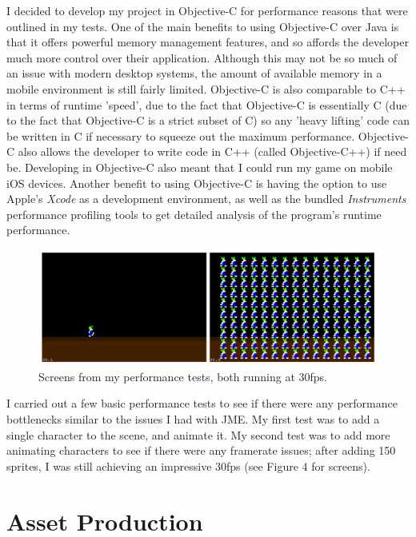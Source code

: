 \documentclass[a4paper,oneside]{report}
\begin{document}
I decided to develop my project in Objective-C for performance reasons that were outlined in my tests. One of the main benefits to using Objective-C over Java is that it offers powerful memory management features, and so affords the developer much more control over their application. Although this may not be so much of an issue with modern desktop systems, the amount of available memory in a mobile environment is still fairly limited. Objective-C is also comparable to C++ in terms of runtime 'speed', due to the fact that Objective-C is essentially C (due to the fact that Objective-C is a strict subset of C) so any 'heavy lifting' code can be written in C if necessary to squeeze out the maximum performance. Objective-C also allows the developer to write code in C++ (called Objective-C++) if need be. Developing in Objective-C also meant that I could run my game on mobile iOS devices. Another benefit to using Objective-C is having the option to use Apple's \emph{Xcode} as a development environment, as well as the bundled \emph{Instruments} performance profiling tools to get detailed analysis of the program's runtime performance.

\begin{figure}[h!]
  \centering
    \includegraphics[width=140mm]{sources/images/InitialTests}
    \caption{Screens from my performance tests, both running at 30fps.}
\end{figure}

I carried out a few basic performance tests to see if there were any performance bottlenecks similar to the issues I had with JME. My first test was to add a single character to the scene, and animate it. My second test was to add more animating characters to see if there were any framerate issues; after adding 150 sprites, I was still achieving an impressive 30fps (see Figure 4 for screens). 

\section{Asset Production}
\end{document}
